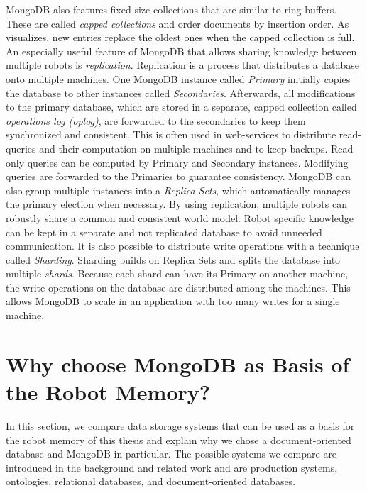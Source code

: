 MongoDB also features fixed-size collections that are similar
to ring buffers. These are called \emph{capped collections} and order
documents by insertion order.
As 
visualizes, new entries replace the oldest ones when the capped
collection is full.
An especially useful feature of MongoDB that allows sharing knowledge
between multiple robots is \emph{replication}. Replication is a
process that distributes a database onto multiple machines.  One
MongoDB instance called \emph{Primary} initially copies the database
to other instances called \emph{Secondaries}.  Afterwards, all
modifications to the primary database, which are stored in a separate,
capped collection called \emph{operations log (oplog)}, are forwarded to the
secondaries to keep them synchronized and consistent.  This is often
used in web-services to distribute read-queries and their computation
on multiple machines and to keep backups.  Read only queries can be
computed by Primary and Secondary instances. Modifying queries are
forwarded to the Primaries to guarantee consistency.  MongoDB can also
group multiple instances into a \emph{Replica Sets}, which
automatically manages the primary election when necessary. By using
replication, multiple robots can robustly share a common and
consistent world model. Robot specific knowledge can be kept in a
separate and not replicated database to avoid unneeded
communication. It is also possible to distribute write operations with
a technique called \emph{Sharding}. Sharding builds on Replica Sets
and splits the database into multiple \emph{shards}. Because each
shard can have its Primary on another machine, the write operations on
the database are distributed among the machines. This allows MongoDB
to scale in an application with too many writes for a single
machine.

\section{Why choose MongoDB as Basis of the Robot Memory?}
\label{sec:basis-representation}
In this section, we compare data storage systems that can be used as a
basis for the robot memory of this thesis and explain why we chose a
document-oriented database and MongoDB in particular. The possible
systems we compare are introduced in
the background and related work and are production systems,
ontologies, relational databases, and document-oriented databases.

